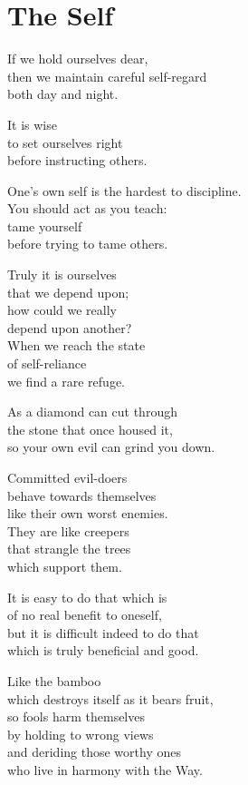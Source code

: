 
\chapter{The Self}


If we hold ourselves dear,\\
then we maintain careful self-regard\\
both day and night.


It is wise\\
to set ourselves right\\
before instructing others.


One's own self is the hardest to discipline.\\
You should act as you teach:\\
tame yourself\\
before trying to tame others.


Truly it is ourselves\\
that we depend upon;\\
how could we really\\
depend upon another?\\
When we reach the state\\
of self-reliance\\
we find a rare refuge.


As a diamond can cut through\\
the stone that once housed it,\\
so your own evil can grind you down.


Committed evil-doers\\
behave towards themselves\\
like their own worst enemies.\\
They are like creepers\\
that strangle the trees\\
which support them.


It is easy to do that which is\\
of no real benefit to oneself,\\
but it is difficult indeed to do that\\
which is truly beneficial and good.


Like the bamboo\\
which destroys itself as it bears fruit,\\
so fools harm themselves\\
by holding to wrong views\\
and deriding those worthy ones\\
who live in harmony with the Way.


